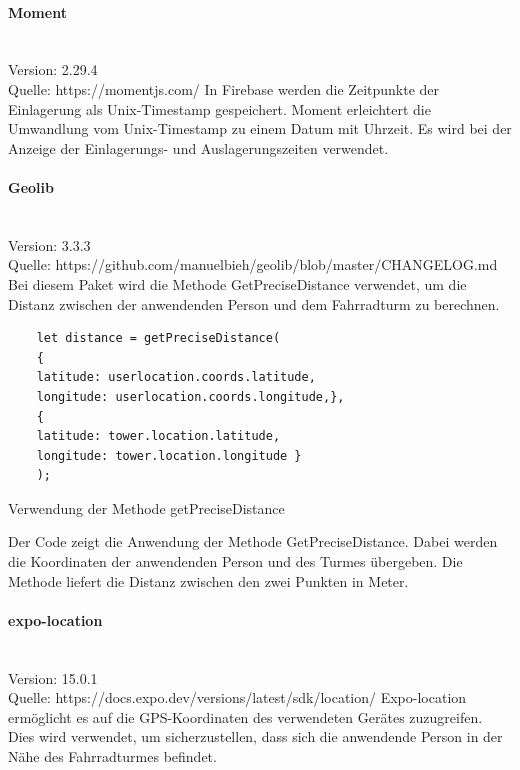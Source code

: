 \paragraph{Moment}\mbox{}\\
Version: 2.29.4\\ Quelle: https://momentjs.com/
\bigskip
In Firebase werden die Zeitpunkte der Einlagerung als \Gls{Unix-Timestamp} gespeichert. Moment erleichtert die Umwandlung vom \Gls{Unix-Timestamp} zu einem Datum mit Uhrzeit. Es wird bei der Anzeige der Einlagerungs- und Auslagerungszeiten verwendet.

\paragraph{Geolib}\mbox{}\\
Version: 3.3.3\\ Quelle: https://github.com/manuelbieh/geolib/blob/master/CHANGELOG.md
\bigskip
Bei diesem Paket wird die Methode GetPreciseDistance verwendet, um die Distanz zwischen der anwendenden Person und dem Fahrradturm zu berechnen.
\begin{listing}[H]
  \begin{verbatim}
    let distance = getPreciseDistance(
    {
    latitude: userlocation.coords.latitude,
    longitude: userlocation.coords.longitude,},
    { 
    latitude: tower.location.latitude, 
    longitude: tower.location.longitude }
    );
\end{verbatim}
  \caption{Verwendung der Methode getPreciseDistance}
  \label{lst:getprecisedistance}
\end{listing}
Der Code zeigt die Anwendung der Methode GetPreciseDistance. Dabei werden die Koordinaten der anwendenden Person und des Turmes übergeben. Die Methode liefert die Distanz zwischen den zwei Punkten in Meter.

\paragraph{expo-location}\mbox{}\\
Version: 15.0.1\\
Quelle: https://docs.expo.dev/versions/latest/sdk/location/
\bigskip
Expo-location ermöglicht es auf die GPS-Koordinaten des verwendeten Gerätes zuzugreifen. Dies wird verwendet, um sicherzustellen, dass sich die anwendende Person in der Nähe des Fahrradturmes befindet.


